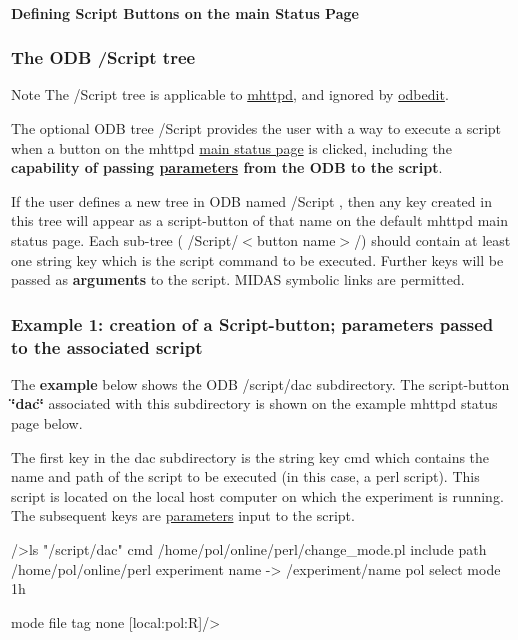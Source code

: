 \paragraph{Defining Script Buttons on the main Status Page}\label{RC_mhttpd_defining_script_buttons}
\par




\label{RC_mhttpd_defining_script_buttons_idx_ODB_tree_Script}
\hypertarget{RC_mhttpd_defining_script_buttons_idx_ODB_tree_Script}{}
 \hypertarget{RC_mhttpd_defining_script_buttons_RC_odb_script_tree}{}\subsubsection{The ODB /Script tree}\label{RC_mhttpd_defining_script_buttons_RC_odb_script_tree}
\begin{DoxyNote}{Note}
The /Script tree is applicable to \hyperlink{RC_mhttpd}{mhttpd}, and ignored by \hyperlink{RC_odbedit}{odbedit}.
\end{DoxyNote}
The optional ODB tree /Script provides the user with a way to execute a script when a button on the mhttpd \hyperlink{RC_mhttpd_Main_Status_page_RC_mhttpd_main_status}{main status page} is clicked, including the {\bfseries capability of passing \hyperlink{structparameters}{parameters} from the ODB to the script}.

\par
 If the user defines a new tree in ODB named /Script , then any key created in this tree will appear as a script-\/button of that name on the default mhttpd main status page. Each sub-\/tree ( /Script/$<$button name$>$/) should contain at least one string key which is the script command to be executed. Further keys will be passed as {\bfseries  arguments } to the script. MIDAS symbolic links are permitted.\hypertarget{RC_mhttpd_defining_script_buttons_RC_odb_script_example1}{}\subsubsection{Example 1: creation of a Script-\/button; parameters passed to the associated script}\label{RC_mhttpd_defining_script_buttons_RC_odb_script_example1}
The {\bfseries  example } below shows the ODB /script/dac subdirectory. The script-\/button {\bfseries \char`\"{}dac\char`\"{}} associated with this subdirectory is shown on the example mhttpd status page below.

The first key in the dac subdirectory is the string key cmd which contains the name and path of the script to be executed (in this case, a perl script). This script is located on the local host computer on which the experiment is running. The subsequent keys are \hyperlink{structparameters}{parameters} input to the script. 
\begin{DoxyCode}
/>ls "/script/dac"
cmd                             /home/pol/online/perl/change_mode.pl
include path                    /home/pol/online/perl
experiment name -> /experiment/name
                                pol
select mode                     1h

mode file tag                   none
[local:pol:R]/>  
\end{DoxyCode}


